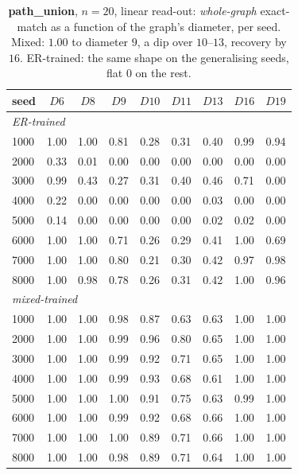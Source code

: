 \documentclass[11pt,a4paper]{article}
\begin{document}
\begin{table}[H]\centering\small
\begin{tabular}{lcccccccc}
\toprule
seed & $D6$ & $D8$ & $D9$ & $D10$ & $D11$ & $D13$ & $D16$ & $D19$ \\
\midrule
\multicolumn{9}{l}{\emph{ER-trained}}\\
1000 & 1.00 & 1.00 & 0.81 & 0.28 & 0.31 & 0.40 & 0.99 & 0.94 \\
2000 & 0.33 & 0.01 & 0.00 & 0.00 & 0.00 & 0.00 & 0.00 & 0.00 \\
3000 & 0.99 & 0.43 & 0.27 & 0.31 & 0.40 & 0.46 & 0.71 & 0.00 \\
4000 & 0.22 & 0.00 & 0.00 & 0.00 & 0.00 & 0.03 & 0.00 & 0.00 \\
5000 & 0.14 & 0.00 & 0.00 & 0.00 & 0.00 & 0.02 & 0.02 & 0.00 \\
6000 & 1.00 & 1.00 & 0.71 & 0.26 & 0.29 & 0.41 & 1.00 & 0.69 \\
7000 & 1.00 & 1.00 & 0.80 & 0.21 & 0.30 & 0.42 & 0.97 & 0.98 \\
8000 & 1.00 & 0.98 & 0.78 & 0.26 & 0.31 & 0.42 & 1.00 & 0.96 \\
\midrule
\multicolumn{9}{l}{\emph{mixed-trained}}\\
1000 & 1.00 & 1.00 & 0.98 & 0.87 & 0.63 & 0.63 & 1.00 & 1.00 \\
2000 & 1.00 & 1.00 & 0.99 & 0.96 & 0.80 & 0.65 & 1.00 & 1.00 \\
3000 & 1.00 & 1.00 & 0.99 & 0.92 & 0.71 & 0.65 & 1.00 & 1.00 \\
4000 & 1.00 & 1.00 & 0.99 & 0.93 & 0.68 & 0.61 & 1.00 & 1.00 \\
5000 & 1.00 & 1.00 & 1.00 & 0.91 & 0.75 & 0.63 & 0.99 & 1.00 \\
6000 & 1.00 & 1.00 & 0.99 & 0.92 & 0.68 & 0.66 & 1.00 & 1.00 \\
7000 & 1.00 & 1.00 & 1.00 & 0.89 & 0.71 & 0.66 & 1.00 & 1.00 \\
8000 & 1.00 & 1.00 & 0.98 & 0.89 & 0.71 & 0.64 & 1.00 & 1.00 \\
\bottomrule\end{tabular}
\caption{\textbf{path\_union}, $n=20$, linear read-out: \emph{whole-graph} exact-match as a function of the
graph's diameter, per seed. Mixed: $1.00$ to diameter $9$, a dip over $10$--$13$, recovery by
$16$. ER-trained: the same shape on the generalising seeds, flat $0$ on the rest.}
\label{tab:byd_pu_n20}
\end{table}
\end{document}
